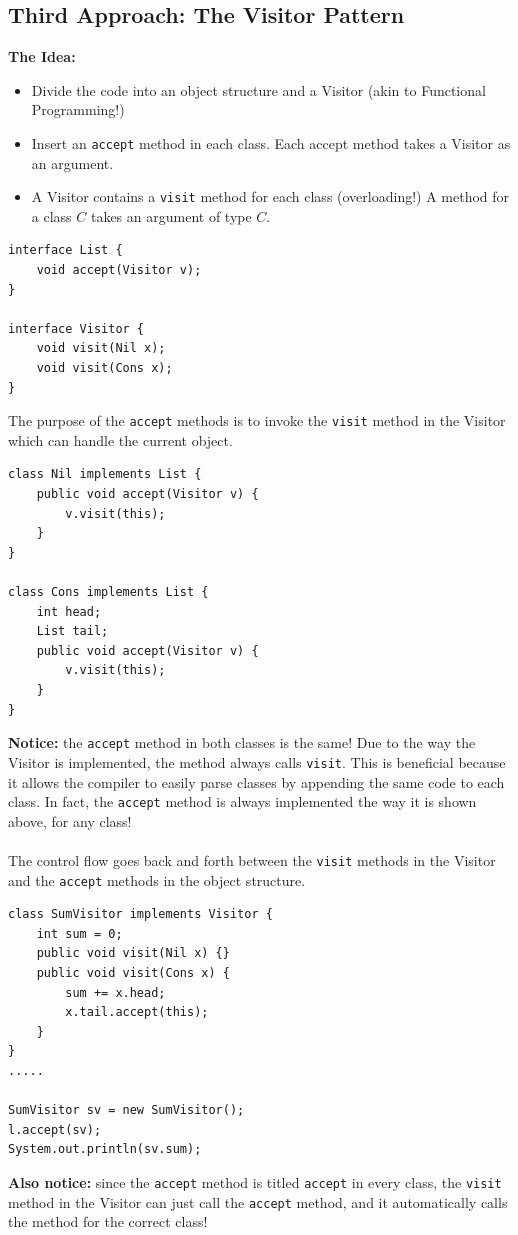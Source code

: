 \documentclass[10pt]{article}
\begin{document}
\subsection*{Third Approach: The Visitor Pattern}
\textbf{The Idea:}
\begin{itemize}
    \item Divide the code into an object structure and a Visitor (akin to Functional Programming!)
    \item Insert an \texttt{accept} method in each class.  Each accept method takes a Visitor as an argument.
    \item A Visitor contains a \texttt{visit} method for each class (overloading!) A method for a class $C$ takes an argument of type $C$.
\end{itemize}
\begin{verbatim}
interface List {
    void accept(Visitor v);
}

interface Visitor {
    void visit(Nil x);
    void visit(Cons x);
}
\end{verbatim}
The purpose of the \texttt{accept} methods is to invoke the \texttt{visit} method in the Visitor which can handle the current object.

\begin{verbatim}
class Nil implements List {
    public void accept(Visitor v) {
        v.visit(this);
    }
}

class Cons implements List {
    int head;
    List tail;
    public void accept(Visitor v) {
        v.visit(this);
    }
}
\end{verbatim}
\textbf{Notice:} the \texttt{accept} method in both classes is the same!  Due to the way the Visitor is implemented, the method always calls \texttt{visit}.  This is beneficial because it allows the compiler to easily parse classes by appending the same code to each class.  In fact, the \texttt{accept} method is always implemented the way it is shown above, for any class!\\\\
The control flow goes back and forth between the \texttt{visit} methods in the Visitor and the \texttt{accept} methods in the object structure.

\begin{verbatim}
class SumVisitor implements Visitor {
    int sum = 0;
    public void visit(Nil x) {}
    public void visit(Cons x) {
        sum += x.head;
        x.tail.accept(this);
    }
}
.....

SumVisitor sv = new SumVisitor();
l.accept(sv);
System.out.println(sv.sum);
\end{verbatim}
\textbf{Also notice:} since the \texttt{accept} method is titled \texttt{accept} in every class, the \texttt{visit} method in the Visitor can just call the \texttt{accept} method, and it automatically calls the method for the correct class!
\end{document}
